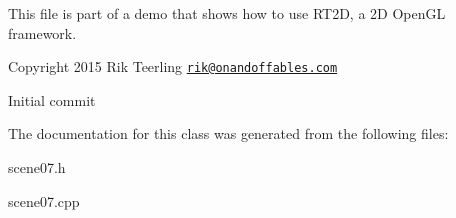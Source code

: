 This file is part of a demo that shows how to use R\+T2D, a 2D Open\+GL framework.


\begin{DoxyItemize}
\item Copyright 2015 Rik Teerling \href{mailto:rik@onandoffables.com}{\tt rik@onandoffables.\+com}
\begin{DoxyItemize}
\item Initial commit 
\end{DoxyItemize}
\end{DoxyItemize}

The documentation for this class was generated from the following files\+:\begin{DoxyCompactItemize}
\item 
scene07.\+h\item 
scene07.\+cpp\end{DoxyCompactItemize}
